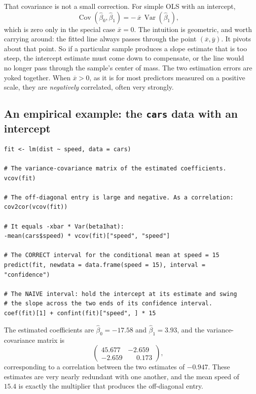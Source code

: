 \documentclass[11pt]{report}
\newcommand{\Var}{\operatorname{Var}}
\begin{document}
That covariance is not a small correction. For simple OLS with an intercept,
\[
\operatorname{Cov}(\widehat{\beta}_0,\widehat{\beta}_1)
=
-\,\overline{x}\,\Var(\widehat{\beta}_1),
\]
which is zero only in the special case \(\overline{x}=0\). The intuition is geometric, and worth carrying around: the fitted line always passes through the point \((\overline{x},\overline{y})\). It pivots about that point. So if a particular sample produces a slope estimate that is too steep, the intercept estimate must come down to compensate, or the line would no longer pass through the sample's center of mass. The two estimation errors are yoked together. When \(\overline{x}>0\), as it is for most predictors measured on a positive scale, they are \emph{negatively} correlated, often very strongly.

\subsection{An empirical example: the \texttt{cars} data with an intercept}

\begin{lstlisting}
fit <- lm(dist ~ speed, data = cars)

# The variance-covariance matrix of the estimated coefficients.
vcov(fit)

# The off-diagonal entry is large and negative. As a correlation:
cov2cor(vcov(fit))

# It equals -xbar * Var(beta1hat):
-mean(cars$speed) * vcov(fit)["speed", "speed"]

# The CORRECT interval for the conditional mean at speed = 15
predict(fit, newdata = data.frame(speed = 15), interval = "confidence")

# The NAIVE interval: hold the intercept at its estimate and swing
# the slope across the two ends of its confidence interval.
coef(fit)[1] + confint(fit)["speed", ] * 15
\end{lstlisting}

The estimated coefficients are \(\widehat{\beta}_0=-17.58\) and \(\widehat{\beta}_1=3.93\), and the variance-covariance matrix is
\[
\begin{pmatrix}
45.677 & -2.659\\
-2.659 & \phantom{-}0.173
\end{pmatrix},
\]
corresponding to a correlation between the two estimates of \(-0.947\). These estimates are very nearly redundant with one another, and the mean speed of \(15.4\) is exactly the multiplier that produces the off-diagonal entry.
\end{document}
